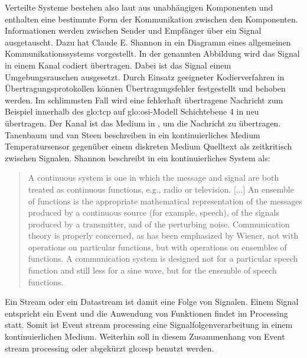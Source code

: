 Verteilte Systeme bestehen also laut  aus unabhängigen Komponenten und enthalten eine bestimmte Form der Kommunikation zwischen den Komponenten. Informationen werden zwischen Sender und Empfänger über ein Signal ausgetauscht. Dazu hat Claude E. Shannon in  ein Diagramm eines allgemeinen Kommunikationssystems vorgestellt. In der genannten Abbildung wird das Signal in einem Kanal codiert übertragen. Dabei ist das Signal einem Umgebungsrauschen ausgesetzt. Durch Einsatz geeigneter Kodierverfahren in Übertragungsprotokollen können Übertragungsfehler festgestellt und behoben werden. Im schlimmsten Fall wird eine fehlerhaft übertragene Nachricht zum Beispiel innerhalb des \gls{glo:tcp} auf \gls{glo:osi}-Modell Schichtebene 4 in  neu übertragen. Der Kanal ist das Medium in , um die Nachricht zu übertragen. %
Tanenbaum und van Steen beschreiben in  ein kontinuierliches Medium Temperatursensor gegenüber einem diskreten Medium Quelltext als zeitkritisch zwischen Signalen. %
Shannon beschreibt in  ein kontinuierliches System als:

\begin{quote}
A continuous system is one in which the message and signal are both treated as continuous functions, e.g., radio or television. [...]
An ensemble of functions is the appropriate mathematical representation of the messages produced by
a continuous source (for example, speech), of the signals produced by a transmitter, and of the perturbing
noise. Communication theory is properly concerned, as has been emphasized by Wiener, not with operations
on particular functions, but with operations on ensembles of functions. A communication system is designed
not for a particular speech function and still less for a sine wave, but for the ensemble of speech functions.
\end{quote}

Ein Stream oder ein Datastream ist damit eine Folge von Signalen. Einem Signal entspricht ein Event und die Anwendung von Funktionen findet im Processing statt. Somit ist Event stream processing eine Signalfolgenverarbeitung in einem kontinuierlichen Medium. Weiterhin soll in diesem Zusammenhang von Event stream processing oder abgekürzt \acrshort{glo:esp} benutzt werden.

